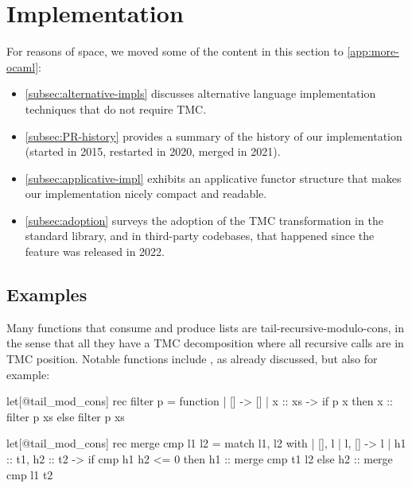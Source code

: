 \section{\OCaml Implementation}
\label{sec:implementation}

For reasons of space, we moved some of the content in this section to \cref{app:more-ocaml}:
\begin{itemize}
\item \cref{subsec:alternative-impls}
  discusses alternative language implementation techniques that do not require TMC.
\item \cref{subsec:PR-history} provides a summary of the history of our implementation (started in 2015, restarted in 2020, merged in 2021).
\item \cref{subsec:applicative-impl} exhibits an applicative functor structure that makes our implementation nicely compact and readable.
\item \cref{subsec:adoption} surveys the adoption of the TMC transformation in the standard library,
  and in third-party \OCaml codebases, that happened since the feature was released in 2022.
\end{itemize}

\subsection{Examples}
\label{subsec:ocaml-examples}

Many functions that consume and produce lists are
tail-recursive-modulo-cons, in the sense that all they have a TMC
decomposition where all recursive calls are in TMC position. Notable
functions include , as already discussed, but also for
example:

\begin{minipage}{0.47\linewidth}
\begin{Ocaml}
let[@tail_mod_cons] rec filter p =
  function
  | [] -> []
  | x :: xs ->
    if p x
    then x :: filter p xs
    else filter p xs
\end{Ocaml}
\end{minipage}
\hfill
\begin{minipage}{0.53\linewidth}
\begin{Ocaml}
let[@tail_mod_cons] rec merge cmp l1 l2 =
  match l1, l2 with
  | [], l | l, [] -> l
  | h1 :: t1, h2 :: t2 ->
      if cmp h1 h2 <= 0
      then h1 :: merge cmp t1 l2
      else h2 :: merge cmp l1 t2
\end{Ocaml}
\end{minipage}

